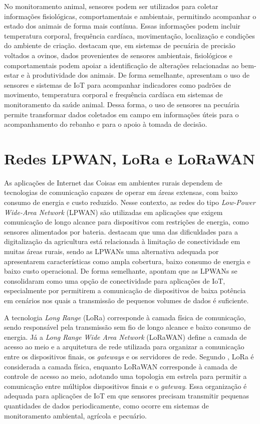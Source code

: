No monitoramento animal, sensores podem ser utilizados para coletar informações fisiológicas, comportamentais e ambientais, permitindo acompanhar o estado dos animais de forma mais contínua. Essas informações podem incluir temperatura corporal, frequência cardíaca, movimentação, localização e condições do ambiente de criação.  destacam que, em sistemas de pecuária de precisão voltados a ovinos, dados provenientes de sensores ambientais, fisiológicos e comportamentais podem apoiar a identificação de alterações relacionadas ao bem-estar e à produtividade dos animais. De forma semelhante,  apresentam o uso de sensores e sistemas de IoT para acompanhar indicadores como padrões de movimento, temperatura corporal e frequência cardíaca em sistemas de monitoramento da saúde animal. Dessa forma, o uso de sensores na pecuária permite transformar dados coletados em campo em informações úteis para o acompanhamento do rebanho e para o apoio à tomada de decisão.

\section{Redes LPWAN, LoRa e LoRaWAN}
\label{sec:lpwan-lora-lorawan}

As aplicações de Internet das Coisas em ambientes rurais dependem de tecnologias de comunicação capazes de operar em áreas extensas, com baixo consumo de energia e custo reduzido. Nesse contexto, as redes do tipo \textit{Low-Power Wide-Area Network} (LPWAN) são utilizadas em aplicações que exigem comunicação de longo alcance para dispositivos com restrições de energia, como sensores alimentados por bateria.  destacam que uma das dificuldades para a digitalização da agricultura está relacionada à limitação de conectividade em muitas áreas rurais, sendo as LPWANs uma alternativa adequada por apresentarem características como ampla cobertura, baixo consumo de energia e baixo custo operacional. De forma semelhante,  apontam que as LPWANs se consolidaram como uma opção de conectividade para aplicações de IoT, especialmente por permitirem a comunicação de dispositivos de baixa potência em cenários nos quais a transmissão de pequenos volumes de dados é suficiente.

A tecnologia \textit{Long Range} (LoRa) corresponde à camada física de comunicação, sendo responsável pela transmissão sem fio de longo alcance e baixo consumo de energia. Já a \textit{Long Range Wide Area Network} (LoRaWAN) define a camada de acesso ao meio e a arquitetura de rede utilizada para organizar a comunicação entre os dispositivos finais, os \textit{gateways} e os servidores de rede. Segundo , LoRa é considerada a camada física, enquanto LoRaWAN corresponde à camada de controle de acesso ao meio, adotando uma topologia em estrela para permitir a comunicação entre múltiplos dispositivos finais e o \textit{gateway}. Essa organização é adequada para aplicações de IoT em que sensores precisam transmitir pequenas quantidades de dados periodicamente, como ocorre em sistemas de monitoramento ambiental, agrícola e pecuário.

